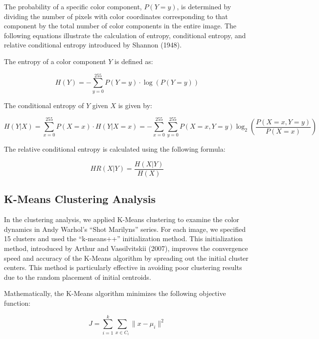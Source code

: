 \documentclass{article}
\begin{document}
The probability of a specific color component, \(P(Y=y)\), is determined
by dividing the number of pixels with color coordinates corresponding to
that component by the total number of color components in the entire
image. The following equations illustrate the calculation of entropy,
conditional entropy, and relative conditional entropy introduced by
Shannon (1948).

The entropy of a color component \(Y\) is defined as:

\begin{equation}
  H(Y) = - \sum_{y=0}^{255} P(Y = y) \cdot \log(P(Y = y))
\end{equation}

The conditional entropy of \(Y\) given \(X\) is given by:

\begin{equation}
  H(Y|X) = \sum_{x=0}^{255} P(X = x) \cdot H(Y|X = x) = - \sum_{x=0}^{255} \sum_{y=0}^{255} P(X = x, Y = y) \log_2 \left(\frac{P(X = x, Y = y)}{P(X = x)}\right)
\end{equation}

The relative conditional entropy is calculated using the following
formula:

\begin{equation}
  HR(X|Y) = \frac{H(X|Y)}{H(X)}
\end{equation}

\hypertarget{k-means-clustering-analysis}{%
\subsection{K-Means Clustering
Analysis}\label{k-means-clustering-analysis}}

In the clustering analysis, we applied K-Means clustering to examine the
color dynamics in Andy Warhol's ``Shot Marilyns'' series. For each
image, we specified 15 clusters and used the ``k-means++''
initialization method. This initialization method, introduced by Arthur
and Vassilvitskii (2007), improves the convergence speed and accuracy of
the K-Means algorithm by spreading out the initial cluster centers. This
method is particularly effective in avoiding poor clustering results due
to the random placement of initial centroids.

Mathematically, the K-Means algorithm minimizes the following objective
function:

\begin{equation}
  J = \sum_{i=1}^{k} \sum_{x \in C_i} \| x - \mu_i \|^2
\end{equation}
\end{document}
